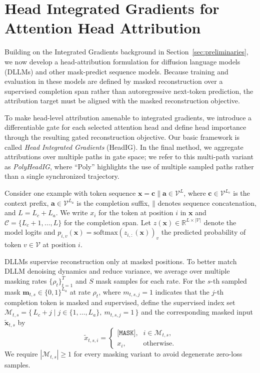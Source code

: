 \section{Head Integrated Gradients for Attention Head Attribution}
\label{ch:method}

Building on the Integrated Gradients background in Section~\ref{sec:preliminaries}, we now develop a head-attribution formulation for diffusion language models (DLLMs) and other mask-predict sequence models. Because training and evaluation in these models are defined by masked reconstruction over a supervised completion span rather than autoregressive next-token prediction, the attribution target must be aligned with the masked reconstruction objective.

To make head-level attribution amenable to integrated gradients, we introduce a differentiable gate for each selected attention head and define head importance through the resulting gated reconstruction objective. Our basic framework is called \emph{Head Integrated Gradients} (HeadIG). In the final method, we aggregate attributions over multiple paths in gate space; we refer to this multi-path variant as \emph{PolyHeadIG}, where ``Poly'' highlights the use of multiple sampled paths rather than a single synchronized trajectory.

Consider one example with token sequence $\mathbf{x} = \mathbf{c} \mathbin{\|} \mathbf{a} \in \mathcal{V}^{L}$, where $\mathbf{c}\in\mathcal{V}^{L_c}$ is the context prefix, $\mathbf{a}\in\mathcal{V}^{L_a}$ is the completion suffix, $\mathbin{\|}$ denotes sequence concatenation, and $L=L_c+L_a$. We write $x_i$ for the token at position $i$ in $\mathbf{x}$ and $\mathcal{C}=\{L_c+1,\dots,L\}$ for the completion span. Let $z(\mathbf{x})\in\mathbb{R}^{L\times |\mathcal{V}|}$ denote the model logits and $p_{i,v}(\mathbf{x})=\mathrm{softmax}(z_{i,:}(\mathbf{x}))_v$ the predicted probability of token $v\in\mathcal{V}$ at position $i$.

DLLMs supervise reconstruction only at masked positions. To better match DLLM denoising dynamics and reduce variance, we average over multiple masking rates $\{\rho_t\}_{t=1}^{T}$ and $S$ mask samples for each rate. For the $s$-th sampled mask $\mathbf{m}_{t,s}\in\{0,1\}^{L_a}$ at rate $\rho_t$, where $m_{t,s,j}=1$ indicates that the $j$-th completion token is masked and supervised, define the supervised index set $\mathcal{M}_{t,s}=\{\,L_c+j \mid j\in\{1,\dots,L_a\},\ m_{t,s,j}=1\,\}$ and the corresponding masked input $\tilde{\mathbf{x}}_{t,s}$ by
\begin{equation}
    \tilde{x}_{t,s,i}=
    \begin{cases}
        \texttt{[MASK]}, & i\in\mathcal{M}_{t,s},\\
        x_i, & \text{otherwise.}
    \end{cases}
\end{equation}
We require $|\mathcal{M}_{t,s}|\ge 1$ for every masking variant to avoid degenerate zero-loss samples.

